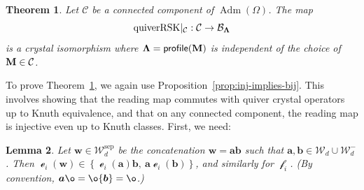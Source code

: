 \documentclass[12pt]{amsart}
\newcommand{\bs}{\boldsymbol}
\DeclareMathOperator{\Std}{\operatorname{Adm}}
\DeclareMathOperator{\worde}{{\mathcal e}}
\DeclareMathOperator{\wordf}{{\mathcal f}}
\newtheorem{theorem}{Theorem}[section]
\newtheorem{lemma}[theorem]{Lemma}
\theoremstyle{definition}
\theoremstyle{remark}
\begin{document}
\begin{theorem} \label{prop:quiverRSK-crystal-isom}
Let $\mathcal{C}$ be a connected component of $\Std(\Omega)$. 
The map 
\[\operatorname{quiverRSK}\!|_\mathcal{C}: \mathcal{C}\to \mathcal{B}_{\bf \Lambda}\] 
is a crystal isomorphism where
${\bf \Lambda}={\sf profile}({\bf M})$ is independent of the choice of ${\bf M}\in {\mathcal C}$.
\end{theorem}

To prove Theorem~\ref{prop:quiverRSK-crystal-isom}, we again use Proposition~\ref{prop:inj-implies-bij}. This involves showing that the reading map commutes with quiver crystal operators up to Knuth equivalence, and that on any connected component, the reading map is injective even up to Knuth classes. First, we need:
\begin{lemma}\label{lem:separated-crystal-combined-word}
Let ${\bs w}\in {\mathcal W}_{d}^{\operatorname{sep}}$ be the concatenation ${\bs w} = {\bs a}{\bs b}$ such that ${\bs a},{\bs b}\in {\mathcal W}_{d}\cup {\mathcal W}_{d}^-$. Then 
$\worde_i({\bs w}) \in\left\{\worde_i({\bs a}){\bs b},\ {\bs a}\worde_i({\bs b})\right\}$, and similarly for $\wordf_i$.
(By convention, ${\bs a}\o=\o{\bs b}=\o$.)
\end{lemma}
\end{document}
